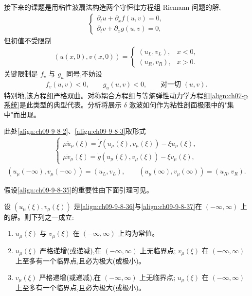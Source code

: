 \documentclass[../../main.tex]{subfiles}
\begin{document}
接下来的课题是用粘性波扇法构造两个守恒律方程组 Riemann 问题的解,
\begin{align}
\begin{cases}
\partial_{t}u+\partial_{x}f(u,v)=0,\\
\partial_{t}v+\partial_{x}g(u,v)=0,
\end{cases}
\label{align:ch09-9-8-33}
\end{align}
但初值不受限制
\begin{align}
(u(x,0),v(x,0))=
\begin{cases}
(u_{L},v_{L}),&x<0,\\
(u_{R},v_{R}),&x>0.
\end{cases}
\label{align:ch09-9-8-34}
\end{align}
关键限制是 $f_{v}$ 与 $g_{u}$ 同号,不妨设
\begin{align}
f_{v}(u,v)<0,\qquad g_{u}(u,v)<0,\qquad\text{对一切 }(u,v).
\label{align:ch09-9-8-35}
\end{align}
特别地,该方程组严格双曲。对称耦合方程组与等熵弹性动力学方程组\eqref{align:ch07-p系统}是此类型的典型代表。分析将展示 $\delta$ 激波如何作为粘性剖面极限中的"集中"而出现。

此处\eqref{align:ch09-9-8-2}、\eqref{align:ch09-9-8-3}取形式
\begin{align}
\begin{cases}
\mu\ddot{u}_{\mu}(\xi)=\dot{f}(u_{\mu}(\xi),v_{\mu}(\xi))-\xi\dot{u}_{\mu}(\xi),\\
\mu\ddot{v}_{\mu}(\xi)=\dot{g}(u_{\mu}(\xi),v_{\mu}(\xi))-\xi\dot{v}_{\mu}(\xi),
\end{cases}
\label{align:ch09-9-8-36}
\end{align}
\begin{align}
(u_{\mu}(-\infty),v_{\mu}(-\infty))=(u_{L},v_{L}),\qquad(u_{\mu}(\infty),v_{\mu}(\infty))=(u_{R},v_{R}).
\label{align:ch09-9-8-37}
\end{align}

假设\eqref{align:ch09-9-8-35}的重要性由下面引理可见。

\begin{lemma}\label{lemma:ch09-粘性解单调性}
设 $(u_{\mu}(\xi),v_{\mu}(\xi))$ 是\eqref{align:ch09-9-8-36}与\eqref{align:ch09-9-8-37}在 $(-\infty,\infty)$ 上的解。则下列之一成立:
\begin{enumerate}
\item $u_{\mu}(\xi)$ 与 $v_{\mu}(\xi)$ 在 $(-\infty,\infty)$ 上均为常值。
\item $u_{\mu}(\xi)$ 严格递增(或递减),在 $(-\infty,\infty)$ 上无临界点; $v_{\mu}(\xi)$ 在 $(-\infty,\infty)$ 上至多有一个临界点,且必为极大(或极小)。
\item $v_{\mu}(\xi)$ 严格递增(或递减),在 $(-\infty,\infty)$ 上无临界点; $u_{\mu}(\xi)$ 在 $(-\infty,\infty)$ 上至多有一个临界点,且必为极大(或极小)。
\end{enumerate}
\end{lemma}
\end{document}
